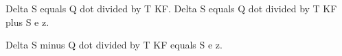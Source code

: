 Delta S equals Q dot divided by T KF. Delta S equals Q dot divided by T KF plus S e z.

Delta S minus Q dot divided by T KF equals S e z.